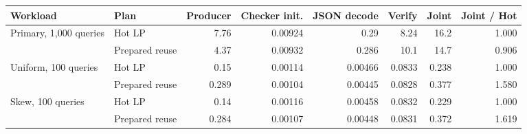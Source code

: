 \begingroup\fontsize{8}{9.4}\selectfont\setlength{\tabcolsep}{3.5pt}
\begin{tabular*}{\textwidth}{@{\extracolsep{\fill}}llrrrrrr@{}}
\toprule
Workload & Plan & Producer & Checker init. & JSON decode & Verify & Joint & Joint / Hot\\
\midrule
Primary, 1,000 queries & Hot LP & 7.76 & 0.00924 & 0.29 & 8.24 & 16.2 & 1.000\\
 & Prepared reuse & 4.37 & 0.00932 & 0.286 & 10.1 & 14.7 & 0.906\\
Uniform, 100 queries & Hot LP & 0.15 & 0.00114 & 0.00466 & 0.0833 & 0.238 & 1.000\\
 & Prepared reuse & 0.289 & 0.00104 & 0.00445 & 0.0828 & 0.377 & 1.580\\
Skew, 100 queries & Hot LP & 0.14 & 0.00116 & 0.00458 & 0.0832 & 0.229 & 1.000\\
 & Prepared reuse & 0.284 & 0.00107 & 0.00448 & 0.0831 & 0.372 & 1.619\\
\bottomrule
\end{tabular*}
\endgroup
